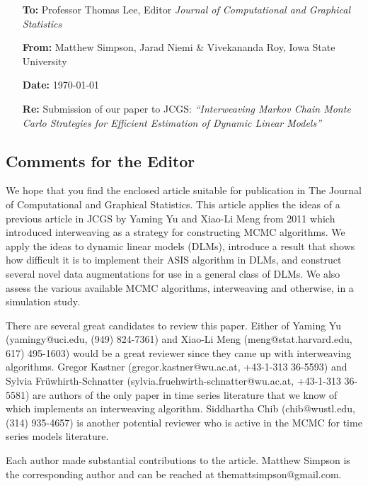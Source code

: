 \documentclass[11pt]{article}
\begin{document}
\begin{itemize}
\item[\bf To:]  Professor Thomas Lee,  Editor\newline
{\em Journal of Computational and Graphical Statistics}
\item[\bf From:] Matthew Simpson, Jarad Niemi \& Vivekananda Roy, Iowa State University
\item[\bf Date:] \today
\item[\bf Re:] Submission of our paper to JCGS:
{\em ``Interweaving Markov Chain Monte Carlo Strategies for Efficient
    Estimation of Dynamic Linear Models''}
\end{itemize}

\subsection*{Comments for the Editor}

We hope that you find the enclosed article suitable for publication in The Journal of Computational and Graphical Statistics. This article applies the ideas of a previous article in JCGS by Yaming Yu and Xiao-Li Meng from 2011 which introduced interweaving as a strategy for constructing MCMC algorithms. We apply the ideas to dynamic linear models (DLMs), introduce a result that shows how difficult it is to implement their ASIS algorithm in DLMs, and construct several novel data augmentations for use in a general class of DLMs. We also assess the various available MCMC algorithms, interweaving and otherwise, in a simulation study.

There are several great candidates to review this paper. Either of Yaming Yu (yamingy@uci.edu, (949) 824-7361) and Xiao-Li Meng (meng@stat.harvard.edu, 617) 495-1603) would be a great reviewer since they came up with interweaving algorithms. Gregor Kastner (gregor.kastner@wu.ac.at, +43-1-313 36-5593) and Sylvia Fr{\"u}whirth-Schnatter (sylvia.fruehwirth-schnatter@wu.ac.at, +43-1-313 36-5581) are authors of the only paper in time series literature that we know of which implements an interweaving algorithm. Siddhartha Chib (chib@wustl.edu, (314) 935-4657) is another potential reviewer who is active in the MCMC for time series models literature.

Each author made substantial contributions to the article. Matthew Simpson is the corresponding author and can be reached at themattsimpson@gmail.com.
\end{document}
